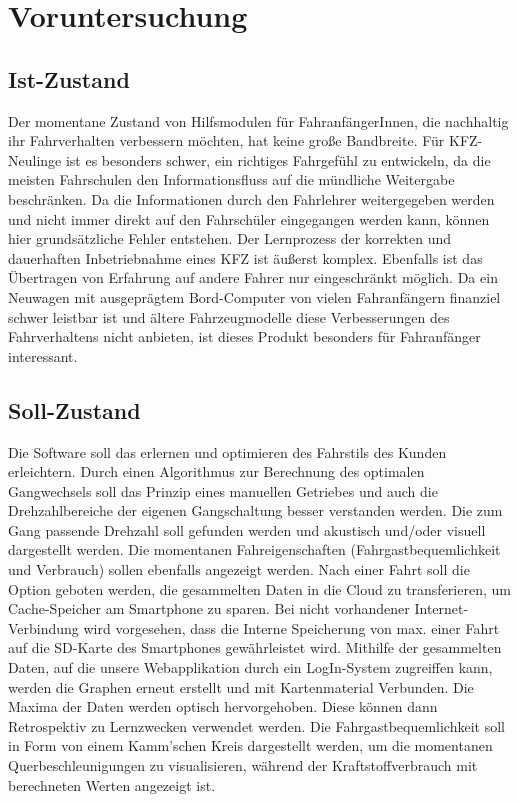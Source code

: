 \chapter{Voruntersuchung}

\section{Ist-Zustand}
Der momentane Zustand von Hilfsmodulen für FahranfängerInnen, die nachhaltig ihr Fahrverhalten verbessern möchten, 
hat keine große Bandbreite. Für KFZ-Neulinge ist es besonders schwer, ein richtiges Fahrgefühl zu entwickeln, 
da die meisten Fahrschulen den Informationsfluss auf die mündliche Weitergabe beschränken. 
Da die Informationen durch den Fahrlehrer weitergegeben werden und nicht immer direkt auf den Fahrschüler eingegangen werden kann, 
können hier grundsätzliche Fehler entstehen. 
Der Lernprozess der korrekten und dauerhaften Inbetriebnahme eines KFZ ist äußerst komplex. 
Ebenfalls ist das Übertragen von Erfahrung auf andere Fahrer nur eingeschränkt möglich.
Da ein Neuwagen mit ausgeprägtem Bord-Computer von vielen Fahranfängern finanziel schwer leistbar ist 
und ältere Fahrzeugmodelle diese Verbesserungen des Fahrverhaltens nicht anbieten, 
ist dieses Produkt besonders für Fahranfänger interessant.

\section{Soll-Zustand}
Die Software soll das erlernen und optimieren des Fahrstils des Kunden erleichtern. 
Durch einen Algorithmus zur Berechnung des optimalen Gangwechsels soll das Prinzip eines manuellen Getriebes und auch die 
Drehzahlbereiche der eigenen Gangschaltung besser verstanden werden. 
Die zum Gang passende Drehzahl soll gefunden werden und akustisch und/oder visuell dargestellt werden. Die 
momentanen Fahreigenschaften (Fahrgastbequemlichkeit und Verbrauch) sollen ebenfalls angezeigt werden. 
\newpage 
Nach einer Fahrt soll die Option geboten werden, die gesammelten Daten in die Cloud zu transferieren, um Cache-Speicher am Smartphone zu sparen.
Bei nicht vorhandener Internet-Verbindung wird vorgesehen, dass die Interne Speicherung von max. einer Fahrt auf die SD-Karte des Smartphones gewährleistet wird.
Mithilfe der gesammelten Daten, auf die unsere Webapplikation durch ein LogIn-System zugreiffen kann, werden die Graphen erneut erstellt und mit Kartenmaterial
Verbunden. 
Die Maxima der Daten werden optisch hervorgehoben. 
Diese können dann Retrospektiv zu Lernzwecken verwendet werden. 
Die Fahrgastbequemlichkeit soll in Form von einem Kamm'schen Kreis dargestellt werden, 
um die momentanen Querbeschleunigungen zu visualisieren, während der Kraftstoffverbrauch mit berechneten Werten angezeigt ist.

